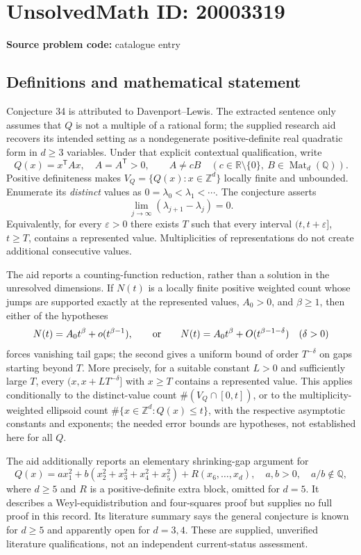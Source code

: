 \documentclass[11pt]{article}
\newcommand{\Z}{\mathbb{Z}}
\newcommand{\Q}{\mathbb{Q}}
\newcommand{\R}{\mathbb{R}}
\begin{document}
\section*{UnsolvedMath ID: 20003319}
\textbf{Source problem code:} catalogue entry
\subsection{Definitions and mathematical statement}
Conjecture 34 is attributed to Davenport--Lewis. The extracted sentence only assumes that $Q$ is not a multiple of a rational form; the supplied research aid recovers its intended setting as a nondegenerate positive-definite real quadratic form in $d\geq3$ variables. Under that explicit contextual qualification, write
\[
 Q(x)=x^{\mathsf T}Ax,\quad A=A^{\mathsf T}>0,\qquad
 A\ne cB\quad(c\in\R\setminus\{0\},\ B\in\operatorname{Mat}_d(\Q)).
\]
Positive definiteness makes $V_Q=\{Q(x):x\in\Z^d\}$ locally finite and unbounded. Enumerate its \emph{distinct} values as $0=\lambda_0<\lambda_1<\cdots$. The conjecture asserts
\[
 \lim_{j\to\infty}(\lambda_{j+1}-\lambda_j)=0.
\]
Equivalently, for every $\varepsilon>0$ there exists $T$ such that every interval $(t,t+\varepsilon]$, $t\geq T$, contains a represented value. Multiplicities of representations do not create additional consecutive values.

The aid reports a counting-function reduction, rather than a solution in the unresolved dimensions. If $N(t)$ is a locally finite positive weighted count whose jumps are supported exactly at the represented values, $A_0>0$, and $\beta\geq1$, then either of the hypotheses
\[
 N(t)=A_0t^\beta+o(t^{\beta-1}),\qquad\hbox{or}\qquad
 N(t)=A_0t^\beta+O(t^{\beta-1-\delta})\quad(\delta>0)
\]
forces vanishing tail gaps; the second gives a uniform bound of order $T^{-\delta}$ on gaps starting beyond $T$. More precisely, for a suitable constant $L>0$ and sufficiently large $T$, every $(x,x+LT^{-\delta}]$ with $x\geq T$ contains a represented value. This applies conditionally to the distinct-value count $\#(V_Q\cap[0,t])$, or to the multiplicity-weighted ellipsoid count $\#\{x\in\Z^d:Q(x)\leq t\}$, with the respective asymptotic constants and exponents; the needed error bounds are hypotheses, not established here for all $Q$.

The aid additionally reports an elementary shrinking-gap argument for
\[
 Q(x)=a x_1^2+b(x_2^2+x_3^2+x_4^2+x_5^2)
       +R(x_6,\ldots,x_d),
 \quad a,b>0,\quad a/b\notin\Q,
\]
where $d\geq5$ and $R$ is a positive-definite extra block, omitted for $d=5$. It describes a Weyl-equidistribution and four-squares proof but supplies no full proof in this record. Its literature summary says the general conjecture is known for $d\geq5$ and apparently open for $d=3,4$. These are supplied, unverified literature qualifications, not an independent current-status assessment.
\end{document}
